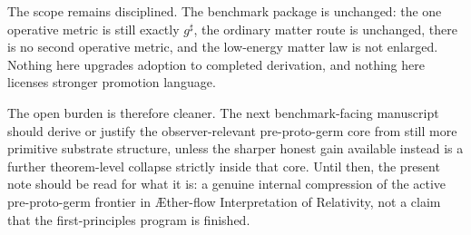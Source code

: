 \documentclass[11pt]{article}
\newcommand{\Aflow}{\AE{}ther-flow}
\newcommand{\TheoryName}{\Aflow{} Interpretation of Relativity}
\newcommand{\CompletedMetric}{g^{\sharp}}
\begin{document}
The scope remains disciplined. The benchmark package is unchanged: the one operative metric is still exactly \(\CompletedMetric\), the ordinary matter route is unchanged, there is no second operative metric, and the low-energy matter law is not enlarged. Nothing here upgrades adoption to completed derivation, and nothing here licenses stronger promotion language.

The open burden is therefore cleaner. The next benchmark-facing manuscript should derive or justify the observer-relevant pre-proto-germ core from still more primitive substrate structure, unless the sharper honest gain available instead is a further theorem-level collapse strictly inside that core. Until then, the present note should be read for what it is: a genuine internal compression of the active pre-proto-germ frontier in \TheoryName{}, not a claim that the first-principles program is finished.
\end{document}
